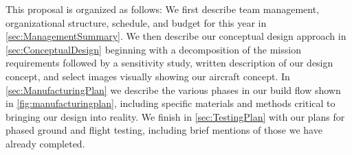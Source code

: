 
This proposal is organized as follows:  We first describe team management, organizational structure, schedule, and budget for this year in \cref{sec:ManagementSummary}.  We then describe our conceptual design approach in \cref{sec:ConceptualDesign} beginning with a decomposition of the mission requirements followed by a sensitivity study, written description of our design concept, and select images visually showing our aircraft concept.  In \cref{sec:ManufacturingPlan} we describe the various phases in our build flow shown in \cref{fig:manufacturingplan}, including specific materials and methods critical to bringing our design into reality. We finish in \cref{sec:TestingPlan} with our plans for phased ground and flight testing, including brief mentions of those we have already completed.
